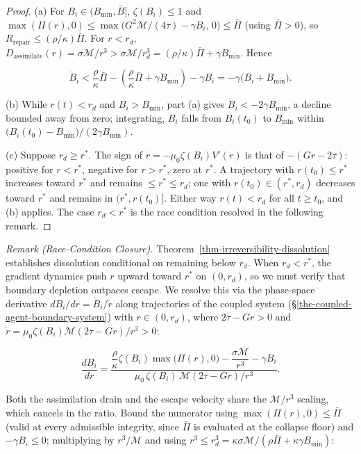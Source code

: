 \documentclass[11pt]{article}
\theoremstyle{plain}
\theoremstyle{definition}
\theoremstyle{remark}
\begin{document}
\begin{proof}
(a) For $B_i \in (B_{\min}, \bar{B}]$, $\zeta(B_i) \leq 1$ and $\max(\Pi(r), 0) \leq \max\bigl(G^2\mathcal{M}/(4\tau) - \gamma B_i,\, 0\bigr) \leq \bar{\Pi}$ (using $\bar{\Pi} > 0$), so $R_{\text{repair}} \leq (\rho/\kappa)\bar{\Pi}$. For $r < r_d$, $D_{\text{assimilate}}(r) = \sigma\mathcal{M}/r^3 > \sigma\mathcal{M}/r_d^3 = (\rho/\kappa)\bar{\Pi} + \gamma B_{\min}$. Hence

$$\dot{B}_i < \frac{\rho}{\kappa}\bar{\Pi} - \left(\frac{\rho}{\kappa}\bar{\Pi} + \gamma B_{\min}\right) - \gamma B_i = -\gamma\bigl(B_i + B_{\min}\bigr).$$

(b) While $r(t) < r_d$ and $B_i > B_{\min}$, part (a) gives $\dot{B}_i < -2\gamma B_{\min}$, a decline bounded away from zero; integrating, $B_i$ falls from $B_i(t_0)$ to $B_{\min}$ within $\bigl(B_i(t_0) - B_{\min}\bigr)/(2\gamma B_{\min})$.

(c) Suppose $r_d \geq r^*$. The sign of $\dot{r} = -\mu_0\zeta(B_i)V'(r)$ is that of $-(Gr - 2\tau)$: positive for $r < r^*$, negative for $r > r^*$, zero at $r^*$. A trajectory with $r(t_0) \leq r^*$ increases toward $r^*$ and remains $\leq r^* \leq r_d$; one with $r(t_0) \in (r^*, r_d)$ decreases toward $r^*$ and remains in $(r^*, r(t_0)]$. Either way $r(t) < r_d$ for all $t \geq t_0$, and (b) applies. The case $r_d < r^*$ is the race condition resolved in the following remark.
\end{proof}

\emph{Remark (Race-Condition Closure).}
Theorem~\ref{thm-irreversibility-dissolution} establishes dissolution
conditional on remaining below \(r_d\). When \(r_d < r^*\), the gradient
dynamics push \(r\) upward toward \(r^*\) on \((0, r_d)\), so we must
verify that boundary depletion outpaces escape. We resolve this via the
phase-space derivative \(dB_i/dr = \dot{B}_i/\dot{r}\) along
trajectories of the coupled system
(§\ref{the-coupled-agent-boundary-system}) with \(r \in (0, r_d)\),
where \(2\tau - Gr > 0\) and
\(\dot{r} = \mu_0\zeta(B_i)\mathcal{M}(2\tau - Gr)/r^3 > 0\):

\[\frac{dB_i}{dr} = \frac{\dfrac{\rho}{\kappa}\zeta(B_i)\max\bigl(\Pi(r),0\bigr) - \dfrac{\sigma\mathcal{M}}{r^3} - \gamma B_i}{\mu_0\,\zeta(B_i)\,\mathcal{M}(2\tau - Gr)/r^3}.\]

Both the assimilation drain and the escape velocity share the
\(\mathcal{M}/r^3\) scaling, which cancels in the ratio. Bound the
numerator using \(\max(\Pi(r), 0) \leq \bar{\Pi}\) (valid at every
admissible integrity, since \(\bar{\Pi}\) is evaluated at the collapse
floor) and \(-\gamma B_i \leq 0\); multiplying by \(r^3/\mathcal{M}\)
and using
\(r^3 \leq r_d^3 = \kappa\sigma\mathcal{M}/(\rho\bar{\Pi} + \kappa\gamma B_{\min})\):
\end{document}
